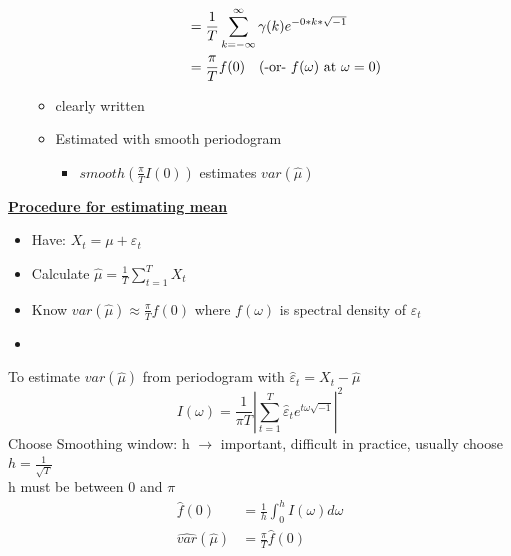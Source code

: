 \begin{itemize}
\begin{itemize}
\begin{align*}
            &=\frac{1}{T} \sum_{k=-\infty}^\infty \gamma(k) e^{-0*k*\sqrt{-1}} \\
            &= \frac{\pi}{T} f(0) \text{\quad (-or- $f(\omega)$ at $\omega=0$)} \\
        \end{align*}
        \item[]  clearly written
        \item Estimated with smooth periodogram
        \begin{itemize}
            \item[] $smooth(\frac{\pi}{T} I(0))$ estimates $var(\hat{\mu})$
        \end{itemize}
    \end{itemize}
\end{itemize}

\textbf{\underline{Procedure for estimating mean}}
\begin{itemize}
    \item Have: $X_t = \mu + \varepsilon_t$
    \item Calculate $\hat{\mu} = \frac{1}{T} \sum_{t=1}^T X_t$
    \item Know $var(\hat{\mu}) \approx \frac{\pi}{T} f(0)$ where $f(\omega)$ is spectral density of $\varepsilon_t$
    \item 
\end{itemize}
To estimate $var(\hat{\mu})$ from periodogram with $\hat{\varepsilon}_t=X_t-\hat{\mu}$ \[I(\omega)=\frac{1}{\pi T} \left| \sum_{t=1}^T \hat{\varepsilon}_t e^{t\omega \sqrt{-1}} \right|^2 \]
Choose Smoothing window: h $\rightarrow$ important, difficult in practice, usually choose $h=\frac{1}{\sqrt{T}}$\\

\quad h must be between $0$ and $\pi$
\begin{align*}
    \hat{f}(0) &= \frac{1}{h} \int_0^h I(\omega)d\omega \\
    \hat{var}(\hat{\mu}) &= \frac{\pi}{T}\hat{f}(0)
\end{align*}


